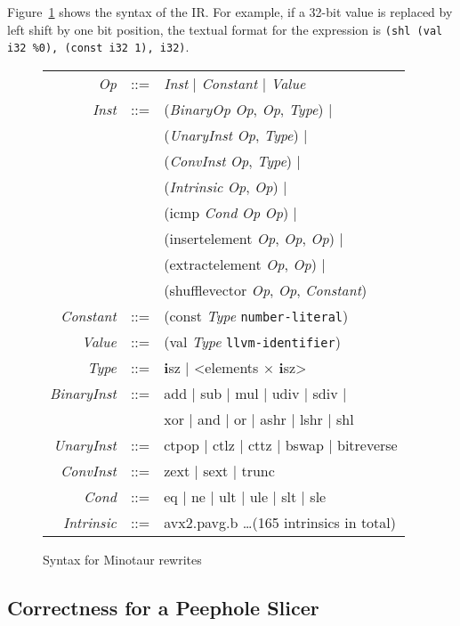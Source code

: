 Figure~\ref{fig:syntax} shows the syntax of the IR\@.
%
For example, if a 32-bit value is replaced by left shift by one bit
position, the textual format for the expression is \texttt{(shl (val
  i32 \%0), (const i32 1), i32)}.


\begin{figure}[tbp]
  \small
  \begin{tabular}{r c l}
    \emph{Op} &::=& \emph{Inst} | \emph{Constant} | \emph{Value} \\
    \emph{Inst}  &::=& (\emph{BinaryOp} \emph{Op}, \emph{Op}, \emph{Type}) | \\
             && (\emph{UnaryInst} \emph{Op}, \emph{Type}) |\\
             && (\emph{ConvInst} \emph{Op}, \emph{Type}) | \\
             && (\emph{Intrinsic} \emph{Op}, \emph{Op}) | \\
             && (icmp \emph{Cond} \emph{Op} \emph{Op}) | \\
             && (insertelement \emph{Op}, \emph{Op}, \emph{Op}) | \\
             && (extractelement \emph{Op}, \emph{Op}) | \\
             && (shufflevector \emph{Op}, \emph{Op}, \emph{Constant}) \\
    \emph{Constant} &::=& (const \emph{Type} \texttt{number-literal}) \\
    \emph{Value} &::=& (val \emph{Type} \texttt{llvm-identifier}) \\
    \emph{Type} &::=& \textbf{i}sz | <elements $\times$ \textbf{i}sz> \\
    \emph{BinaryInst} &::=& add | sub | mul | udiv | sdiv | \\
               && xor | and | or | ashr | lshr | shl\\
    \emph{UnaryInst} &::=& ctpop | ctlz | cttz | bswap | bitreverse\\
    \emph{ConvInst} &::=& zext | sext | trunc \\
    \emph{Cond} &::=& eq | ne | ult | ule | slt | sle \\
    \emph{Intrinsic} &::=& avx2.pavg.b \dots (165 intrinsics in total) \\
  \end{tabular}
  \caption{Syntax for Minotaur rewrites}
  \label{fig:syntax}
\end{figure}


\subsection{Correctness for a Peephole Slicer}

